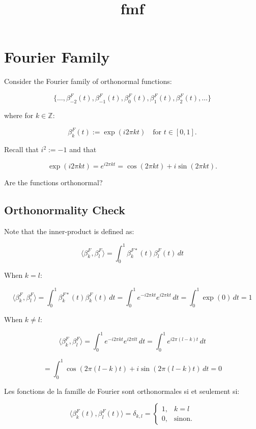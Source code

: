 \documentclass[12pt]{article}
\title{fmf}
\author{}
\date{}
\begin{document}
\maketitle
\tableofcontents
\newpage

\section{Fourier Family}

Consider the Fourier family of orthonormal functions:

\[
\{\ldots, \beta_{-2}^F(t), \beta_{-1}^F(t), \beta_0^F(t), \beta_1^F(t), \beta_2^F(t), \ldots\}
\]

where for \( k \in \mathbb{Z} \):

\[
\beta_k^F(t) := \exp(i2\pi kt) \quad \text{for } t \in [0,1].
\]

Recall that \( i^2 := -1 \) and that 

\[
\exp(i2\pi kt) = e^{i2\pi kt} = \cos(2\pi kt) + i \sin(2\pi kt).
\]

Are the functions orthonormal?

\subsection{Orthonormality Check}

Note that the inner-product is defined as:

\[
\langle \beta_k^F, \beta_l^F \rangle = \int_0^1 \beta_k^{F*}(t) \beta_l^F(t) \, dt
\]

When \( k = l \):

\[
\langle \beta_k^F, \beta_l^F \rangle = \int_0^1 \beta_k^{F*}(t) \beta_k^F(t) \, dt = \int_0^1 e^{-i2\pi kt} e^{i2\pi kt} \, dt = \int_0^1 \exp(0) \, dt = 1
\]

When \( k \neq l \):

\[
\langle \beta_k^F, \beta_l^F \rangle = \int_0^1 e^{-i2\pi kt} e^{i2\pi lt} \, dt = \int_0^1 e^{i2\pi (l-k)t} \, dt
\]

\[
= \int_0^1 \cos(2\pi (l-k)t) + i \sin(2\pi (l-k)t) \, dt = 0
\]

\begin{tcolorbox}[title={À retenir}]
Les fonctions de la famille de Fourier sont orthonormales si et seulement si:

\[
\langle \beta_k^F(t), \beta_l^F(t) \rangle = \delta_{k,l} = 
\begin{cases} 
1, & k = l \\ 
0, & \text{sinon.}
\end{cases}
\]
\end{tcolorbox}
\end{document}
